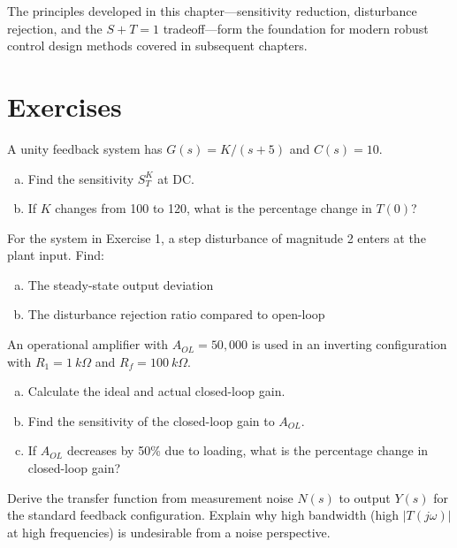The principles developed in this chapter---sensitivity reduction, disturbance rejection, and the $S + T = 1$ tradeoff---form the foundation for modern robust control design methods covered in subsequent chapters.

\newpage
\section{Exercises}
\label{sec:exercises}

\begin{exercise}
A unity feedback system has $G(s) = K/(s+5)$ and $C(s) = 10$.
\begin{enumerate}[(a)]
    \item Find the sensitivity $S^K_T$ at DC.
    \item If $K$ changes from 100 to 120, what is the percentage change in $T(0)$?
\end{enumerate}
\end{exercise}

\begin{exercise}
For the system in Exercise 1, a step disturbance of magnitude 2 enters at the plant input. Find:
\begin{enumerate}[(a)]
    \item The steady-state output deviation
    \item The disturbance rejection ratio compared to open-loop
\end{enumerate}
\end{exercise}

\begin{exercise}
An operational amplifier with $A_{OL} = 50{,}000$ is used in an inverting configuration with $R_1 = \SI{1}{k\Omega}$ and $R_f = \SI{100}{k\Omega}$.
\begin{enumerate}[(a)]
    \item Calculate the ideal and actual closed-loop gain.
    \item Find the sensitivity of the closed-loop gain to $A_{OL}$.
    \item If $A_{OL}$ decreases by 50\% due to loading, what is the percentage change in closed-loop gain?
\end{enumerate}
\end{exercise}

\begin{exercise}
Derive the transfer function from measurement noise $N(s)$ to output $Y(s)$ for the standard feedback configuration. Explain why high bandwidth (high $|T(j\omega)|$ at high frequencies) is undesirable from a noise perspective.
\end{exercise}

